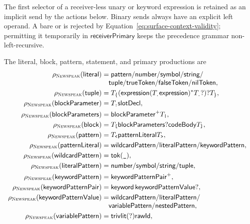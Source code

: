 The first selector of a receiver-less unary or keyword expression is retained
as an implicit send by the actions below.  Binary sends always have an
explicit left operand.  A bare  or  is rejected by
Equation~\eqref{eq:surface-context-validity}; permitting it temporarily in
$\mathsf{receiverPrimary}$ keeps the precedence grammar non-left-recursive.

The literal, block, pattern, statement, and primary productions are
\begin{equation}\label{eq:newspeak-expression-peg}
\begin{aligned}
 \rho_{\NS}(\mathsf{literal})&=\mathsf{pattern}/\mathsf{number}/
   \mathsf{symbol}/\mathsf{string}/\\[-1mm]
 &\quad\mathsf{tuple}/\mathsf{trueToken}/\mathsf{falseToken}/
   \mathsf{nilToken},\\
 \rho_{\NS}(\mathsf{tuple})&=T_{\{}
   (\mathsf{expression}(T_{\texttt{.}}\mathsf{expression})^*
      T_{\texttt{.}}?)?T_{\}},\\
 \rho_{\NS}(\mathsf{blockParameter})&=T_{\texttt{:}}\mathsf{slotDecl},\\
 \rho_{\NS}(\mathsf{blockParameters})&=
      \mathsf{blockParameter}^+T_{\texttt{|}},\\
 \rho_{\NS}(\mathsf{block})&=T_{\texttt{[}}
      \mathsf{blockParameters}?\mathsf{codeBody}T_{\texttt{]}},\\
 \rho_{\NS}(\mathsf{pattern})&=T_{\texttt{<}}\mathsf{patternLiteral}T_{\texttt{>}},\\
 \rho_{\NS}(\mathsf{patternLiteral})&=\mathsf{wildcardPattern}/
      \mathsf{literalPattern}/\mathsf{keywordPattern},\\
 \rho_{\NS}(\mathsf{wildcardPattern})&=\mathsf{tok}(\texttt{\_}),\\
 \rho_{\NS}(\mathsf{literalPattern})&=\mathsf{number}/\mathsf{symbol}/
      \mathsf{string}/\mathsf{tuple},\\
 \rho_{\NS}(\mathsf{keywordPattern})&=\mathsf{keywordPatternPair}^+,\\
 \rho_{\NS}(\mathsf{keywordPatternPair})&=
      \mathsf{keyword}\,\mathsf{keywordPatternValue}?,\\
 \rho_{\NS}(\mathsf{keywordPatternValue})&=\mathsf{wildcardPattern}/
      \mathsf{literalPattern}/\\[-1mm]
 &\quad\mathsf{variablePattern}/\mathsf{nestedPattern},\\
 \rho_{\NS}(\mathsf{variablePattern})&=
      \mathsf{triv}\lit{?}\mathsf{rawId},\\

\end{aligned}
\end{equation}
